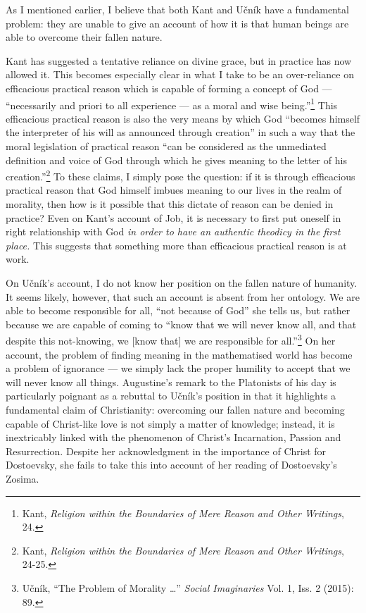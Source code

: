 \documentclass[12pt]{article}
\begin{document}
	As I mentioned earlier, I believe that both Kant and U\v{c}n\'{i}k have a fundamental problem: they are unable to give an account of how it is that human beings are able to overcome their fallen nature. 
	
	Kant has suggested a tentative reliance on divine grace, but in practice has now allowed it. This becomes especially clear in what I take to be an over-reliance on efficacious practical reason which is capable of forming a concept of God --- ``necessarily and priori to all experience --- as a moral and wise being.''\footnote{Kant, \emph{Religion within the Boundaries of Mere Reason and Other Writings}, 24.} This efficacious practical reason is also the very means by which God ``becomes himself the interpreter of his will as announced through creation'' in such a way that the moral legislation of practical reason ``can be considered as the unmediated definition and voice of God through which he gives meaning to the letter of his creation.''\footnote{Kant, \emph{Religion within the Boundaries of Mere Reason and Other Writings}, 24-25.} To these claims, I simply pose the question: if it is through efficacious practical reason that God himself imbues meaning to our lives in the realm of morality, then how is it possible that this dictate of reason can be denied in practice? Even on Kant's account of Job, it is necessary to first put oneself in right relationship with God \emph{in order to have an authentic theodicy in the first place.} This suggests that something more than efficacious practical reason is at work.
	
	On U\v{c}n\'{i}k's account, I do not know her position on the fallen nature of humanity. It seems likely, however, that such an account is absent from her ontology. We are able to become responsible for all, ``not because of God'' she tells us, but rather because we are capable of coming to ``know that we will never know all, and that despite this not-knowing, we [know that] we are responsible for all.''\footnote{U\v{c}n\'{i}k, ``The Problem of Morality \ldots'' \emph{Social Imaginaries} Vol. 1, Iss. 2 (2015): 89.} On her account, the problem of finding meaning in the mathematised world has become a problem of ignorance --- we simply lack the proper humility to accept that we will never know all things. Augustine's remark to the Platonists of his day is particularly poignant as a rebuttal to U\v{c}n\'{i}k's position in that it highlights a fundamental claim of Christianity: overcoming our fallen nature and becoming capable of Christ-like love is not simply a matter of knowledge; instead, it is inextricably linked with the phenomenon of Christ's Incarnation, Passion and Resurrection. Despite her acknowledgment in the importance of Christ for Dostoevsky, she fails to take this into account of her reading of Dostoevsky's Zosima.
	
\end{document}
